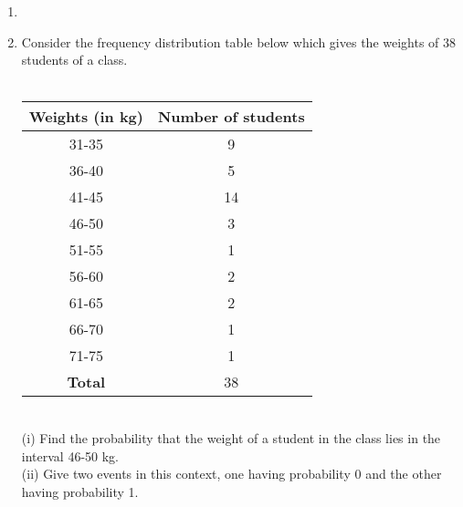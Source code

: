\renewcommand{\theequation}{\theenumi}
\begin{enumerate}[label=\arabic*.,ref=\thesubsection.\theenumi]
\item\item Consider the frequency distribution table below which gives the weights of 38 students of a class.\\
\\
\begin{tabular}{ |c|c| } 
	\hline
	\textbf{Weights (in kg)} &\textbf{Number of students }\\ 
	\hline
	31-35 &9\\
	36-40 &5\\
	41-45 &14\\
	46-50 &3\\
	51-55 &1\\
	56-60 &2\\
	61-65 &2\\
	66-70 &1\\
	71-75 &1\\
	\hline
	\textbf{Total} &38\\
	\hline
\end{tabular}\\

(i) Find the probability that the weight of a student in the class lies in the interval 46-50 kg.\\
(ii) Give two events in this context, one having probability 0 and the other having probability 1.
\end{enumerate}